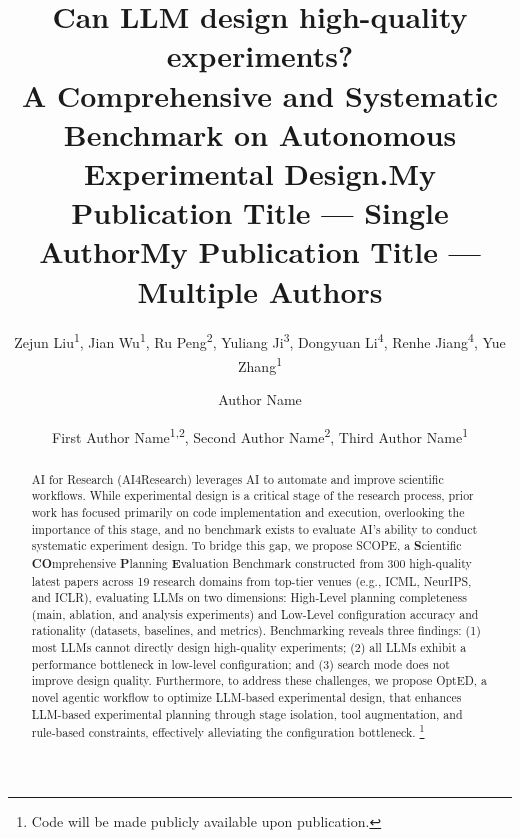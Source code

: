 \documentclass[letterpaper]{article} %
\title{Can LLM design high-quality experiments? \\A Comprehensive and Systematic Benchmark on Autonomous Experimental Design.}
\author{
    Zejun Liu\textsuperscript{\rm 1}\equalcontrib, Jian Wu\textsuperscript{\rm 1}\equalcontrib, 
    Ru Peng\textsuperscript{\rm 2}, Yuliang Ji\textsuperscript{\rm 3}, Dongyuan Li\textsuperscript{\rm 4}, 
    Renhe Jiang\textsuperscript{\rm 4}, Yue Zhang\textsuperscript{\rm 1}\corresponding
}
\title{My Publication Title --- Single Author}
\author {
    Author Name
}
\title{My Publication Title --- Multiple Authors}
\author {
    First Author Name\textsuperscript{\rm 1,\rm 2}\equalcontrib,
    Second Author Name\textsuperscript{\rm 2}\equalcontrib,
    Third Author Name\textsuperscript{\rm 1}\corresponding
}
\begin{document}
\maketitle

\begin{abstract}
AI for Research (AI4Research) leverages AI to automate and improve scientific workflows.
While experimental design is a critical stage of the research process,  prior work has focused primarily on code implementation and execution, overlooking
the importance of this stage, and no benchmark exists to evaluate AI's ability to conduct systematic experiment design. 
To bridge this gap, we propose \textsc{SCOPE}, a \textbf{S}cientific \textbf{CO}mprehensive \textbf{P}lanning \textbf{E}valuation Benchmark constructed from 300 high-quality latest papers across 19 research domains from top-tier venues (e.g., ICML, NeurIPS, and ICLR),
evaluating LLMs on two dimensions: High-Level planning completeness (main, ablation, and analysis experiments) and 
Low-Level configuration accuracy and rationality (datasets, baselines, and metrics). Benchmarking reveals three findings:
(1) most LLMs cannot directly design high-quality experiments; (2) all LLMs exhibit a performance bottleneck in low-level configuration; 
and (3) search mode does not improve design quality. Furthermore, to address these challenges, we propose OptED, a novel agentic workflow to 
optimize LLM-based experimental design, that enhances LLM-based experimental planning through stage isolation, tool augmentation, and 
rule-based constraints,  effectively alleviating the configuration bottleneck. \footnote{Code will be made publicly available upon publication.}
\end{abstract}

\end{document}
